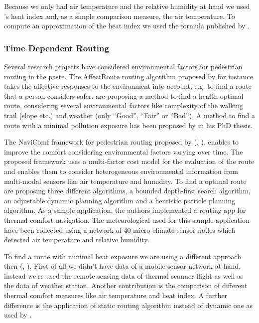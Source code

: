 Because we only had air temperature and the relative humidity at hand we used \citeauthor{Steadman1979}'s heat index \parencite{Steadman1979} and, as a simple comparison measure, the air temperature. To compute an approximation of the heat index we used the formula published by \textcite[77]{Stull2011}. 

\subsubsection{Time Dependent Routing}
Several research projects have considered environmental factors for pedestrian routing in the paste. The AffectRoute routing algorithm proposed by \textcite{Huang2014} for instance takes the affective responses to the environment into account, e.g. to find a route that a person considers safer.  \textcite{Sharker2012} are proposing a method to find a health optimal route, considering several environmental factors like complexity of the walking trail (slope etc.) and weather (only “Good”, “Fair” or “Bad”). A method to find a route with a minimal pollution exposure has been proposed by \textcite{Hasenfratz2015} in his PhD thesis.

The NaviComf framework for pedestrian routing proposed by \citeauthor{Dang2012} (\citeyear{Dang2012}, \citeyear{Dang2013}), enables to improve the comfort considering environmental factors varying over time. The proposed framework uses a multi-factor cost model for the evaluation of the route and enables them to consider heterogeneous environmental information from multi-modal
 sensors like air temperature and humidity. To find a optimal route \textcite{Dang2013} are proposing three different algorithms,  a bounded depth-first search algorithm, an adjustable dynamic planning algorithm and a heuristic particle planning algorithm. As a sample application, the authors implemented a routing app for thermal comfort navigation. The meteorological used for this sample application have been collected using a network of 40 micro-climate sensor nodes which detected air temperature and relative humidity. 


To find a route with minimal heat exposure we are using a different approach then \citeauthor{Dang2012} (\citeyear{Dang2012}, \citeyear{Dang2013}). First of all we didn't have data of a mobile sensor network at hand, instead we're used the remote sensing data of thermal scanner flight as well as the data of weather station. Another contribution is the comparison of different thermal comfort measures like air temperature and heat index. A further difference is the application of static routing algorithm instead of dynamic one as used by \citeauthor{Dang2012}.
